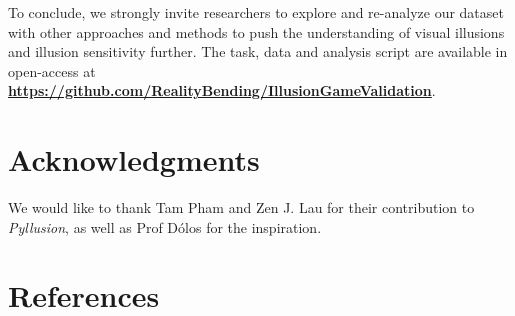 \documentclass[
  man,floatsintext]{apa6}
\begin{document}
To conclude, we strongly invite researchers to explore and re-analyze our dataset with other approaches and methods to push the understanding of visual illusions and illusion sensitivity further. The task, data and analysis script are available in open-access at \href{https://github.com/RealityBending/IllusionGameValidation}{\textbf{https://github.com/RealityBending/IllusionGameValidation}}.

\hypertarget{acknowledgments}{%
\section{Acknowledgments}\label{acknowledgments}}

We would like to thank Tam Pham and Zen J. Lau for their contribution to \emph{Pyllusion}, as well as Prof Dólos for the inspiration.

\newpage

\hypertarget{references}{%
\section{References}\label{references}}
\end{document}

